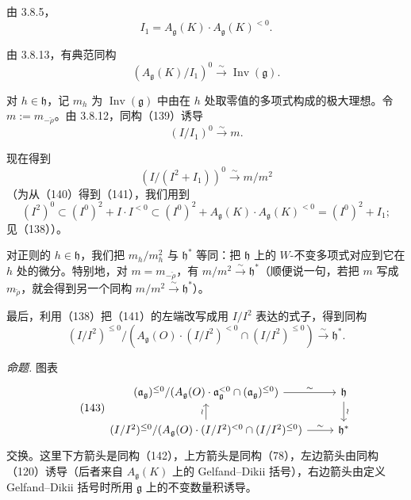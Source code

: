 由 3.8.5，
\begin{equation}\tag{138}
  I_{1}=A_{\mathfrak{g}}(K)\cdot A_{\mathfrak{g}}(K)^{<0}.
\end{equation}

由 3.8.13，有典范同构
\begin{equation}\tag{139}
  (A_{\mathfrak{g}}(K)/I_{1})^{0}\xrightarrow{\sim}\operatorname{Inv}(\mathfrak{g}).
\end{equation}

对 $h\in\mathfrak{h}$，记 $m_{h}$ 为 $\operatorname{Inv}(\mathfrak{g})$ 中由在 $h$ 处取零值的多项式构成的极大理想。令 $m:=m_{-\check\rho}$。由 3.8.12，同构（139）诱导
\begin{equation}\tag{140}
  (I/I_{1})^{0}\xrightarrow{\sim}m.
\end{equation}

现在得到
\begin{equation}\tag{141}
  (I/(I^{2}+I_{1}))^{0}\xrightarrow{\sim}m/m^{2}
\end{equation}
（为从（140）得到（141），我们用到
\[
(I^{2})^{0}\subset(I^{0})^{2}+I\cdot I^{<0}\subset(I^{0})^{2}+A_{\mathfrak{g}}(K)\cdot A_{\mathfrak{g}}(K)^{<0}=(I^{0})^{2}+I_{1};
\]
见（138））。

对正则的 $h\in\mathfrak{h}$，我们把 $m_{h}/m_{h}^{2}$ 与 $\mathfrak{h}^{*}$ 等同：把 $\mathfrak{h}$ 上的 $W$-不变多项式对应到它在 $h$ 处的微分。特别地，对 $m=m_{-\check\rho}$，有 $m/m^{2}\xrightarrow{\sim}\mathfrak{h}^{*}$（顺便说一句，若把 $m$ 写成 $m_{\check\rho}$，就会得到另一个同构 $m/m^{2}\xrightarrow{\sim}\mathfrak{h}^{*}$）。

最后，利用（138）把（141）的左端改写成用 $I/I^{2}$ 表达的式子，得到同构
\begin{equation}\tag{142}
  (I/I^{2})^{\le 0}/(A_{\mathfrak{g}}(O)\cdot(I/I^{2})^{<0}\cap(I/I^{2})^{\le 0})\xrightarrow{\sim}\mathfrak{h}^{*}.
\end{equation}

 \emph{命题.} 图表
\begin{equation}\tag{143}
\begin{tikzcd}[row sep=1.5em]
  (\mathfrak{a}_{\mathfrak{g}})^{\le 0}/(A_{\mathfrak{g}}(O)\cdot\mathfrak{a}_{\mathfrak{g}}^{<0}\cap(\mathfrak{a}_{\mathfrak{g}})^{\le 0})
    \arrow[r, "\sim"] & \mathfrak{h} \arrow[d, "\wr"] \\
  (I/I^{2})^{\le 0}/(A_{\mathfrak{g}}(O)\cdot(I/I^{2})^{<0}\cap(I/I^{2})^{\le 0})
    \arrow[r, "\sim"] \arrow[u, "\wr"] & \mathfrak{h}^{*}
\end{tikzcd}
\end{equation}
交换。这里下方箭头是同构（142），上方箭头是同构（78），左边箭头由同构（120）诱导（后者来自 $A_{\mathfrak{g}}(K)$ 上的 Gelfand--Dikii 括号），右边箭头由定义 Gelfand--Dikii 括号时所用 $\mathfrak{g}$ 上的不变数量积诱导。

